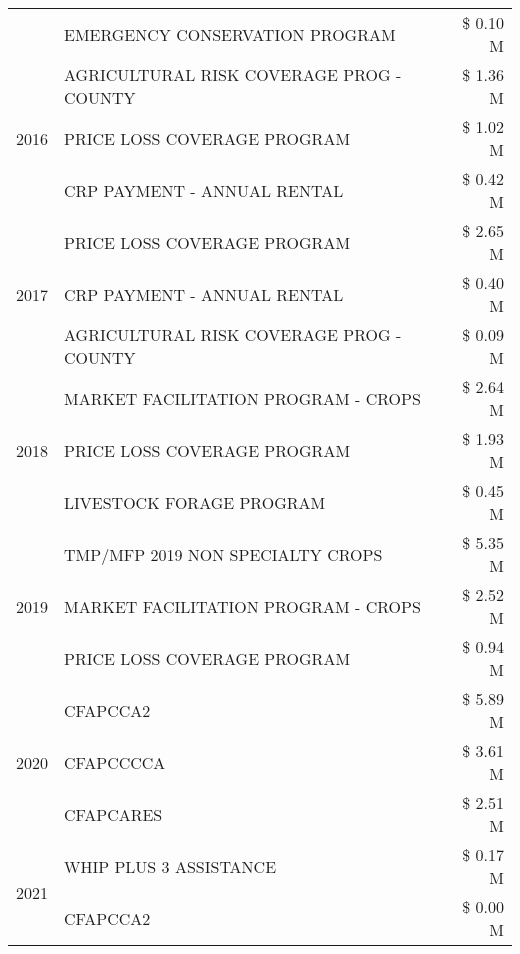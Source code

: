 \begin{tabular}{llr}
 & EMERGENCY CONSERVATION PROGRAM & \$ 0.10 M \\
\cline{1-3}
\multirow[t]{3}{*}{2016} & AGRICULTURAL RISK COVERAGE PROG - COUNTY & \$ 1.36 M \\
 & PRICE LOSS COVERAGE PROGRAM & \$ 1.02 M \\
 & CRP PAYMENT - ANNUAL RENTAL & \$ 0.42 M \\
\cline{1-3}
\multirow[t]{3}{*}{2017} & PRICE LOSS COVERAGE PROGRAM & \$ 2.65 M \\
 & CRP PAYMENT - ANNUAL RENTAL & \$ 0.40 M \\
 & AGRICULTURAL RISK COVERAGE PROG - COUNTY & \$ 0.09 M \\
\cline{1-3}
\multirow[t]{3}{*}{2018} & MARKET FACILITATION PROGRAM - CROPS & \$ 2.64 M \\
 & PRICE LOSS COVERAGE PROGRAM & \$ 1.93 M \\
 & LIVESTOCK FORAGE PROGRAM & \$ 0.45 M \\
\cline{1-3}
\multirow[t]{3}{*}{2019} & TMP/MFP 2019 NON SPECIALTY CROPS & \$ 5.35 M \\
 & MARKET FACILITATION PROGRAM - CROPS & \$ 2.52 M \\
 & PRICE LOSS COVERAGE PROGRAM & \$ 0.94 M \\
\cline{1-3}
\multirow[t]{3}{*}{2020} & CFAPCCA2 & \$ 5.89 M \\
 & CFAPCCCCA & \$ 3.61 M \\
 & CFAPCARES & \$ 2.51 M \\
\cline{1-3}
\multirow[t]{2}{*}{2021} & WHIP PLUS 3 ASSISTANCE & \$ 0.17 M \\
 & CFAPCCA2 & \$ 0.00 M \\
\cline{1-3}
\bottomrule
\end{tabular}

